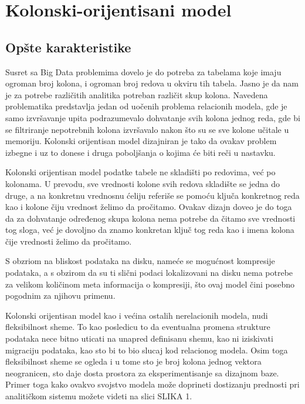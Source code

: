 \documentclass[12pt,oneside]{memoir}
\begin{document}
\section{Kolonski-orijentisani model}
\subsection{Opšte karakteristike}
\cite{ColumnarOriented}
Susret sa Big Data problemima dovelo je do potreba za tabelama koje imaju ogroman broj kolona, i ogroman broj redova u okviru tih tabela. Jasno je da nam je za potrebe različitih analitika potreban različit skup kolona. Navedena problematika predstavlja jedan od uočenih problema relacionih modela, gde je samo izvršavanje upita podrazumevalo dohvatanje svih kolona jednog reda, gde bi se filtriranje nepotrebnih kolona izvršavalo nakon što su se sve kolone učitale u memoriju. Kolonski orijentisan model dizajniran je tako da ovakav problem izbegne i uz to donese i druga poboljšanja o kojima će biti reči u nastavku.

Kolonski orijentisan model podatke tabele ne skladišti po redovima, već po kolonama. U prevodu, sve vrednosti kolone svih redova skladište se jedna do druge, a na konkretnu vrednosnu ćeliju referiše se pomoću ključa konkretnog reda kao i kolone čiju vrednost želimo da pročitamo. Ovakav dizajn doveo je do toga da za dohvatanje određenog skupa kolona nema potrebe da čitamo sve vrednosti tog sloga, već je dovoljno da znamo konkretan ključ tog reda kao i imena kolona čije vrednosti želimo da pročitamo.

S obzriom na bliskost   podataka na disku, nameće se mogućnost kompresije podataka, a s obzirom da su ti slični podaci lokalizovani na disku nema potrebe za velikom količinom meta informacija o kompresiji, što ovaj model čini posebno pogodnim za njihovu primenu.

Kolonski orijentisan model kao i većina ostalih nerelacionih modela, nudi fleksibilnost sheme. To kao posledicu to da eventualna promena strukture podataka nece bitno uticati na unapred definisanu shemu, kao ni iziskivati migraciju podataka, kao sto bi to bio slucaj kod relacionog modela. Osim toga fleksibilnost sheme se ogleda i u tome sto je broj kolona jednog vektora neogranicen, sto daje dosta prostora za eksperimentisanje sa dizajnom baze. Primer toga kako ovakvo svojstvo modela može doprineti dostizanju prednosti pri analitičkom sistemu možete videti na slici SLIKA 1. 
\end{document}
